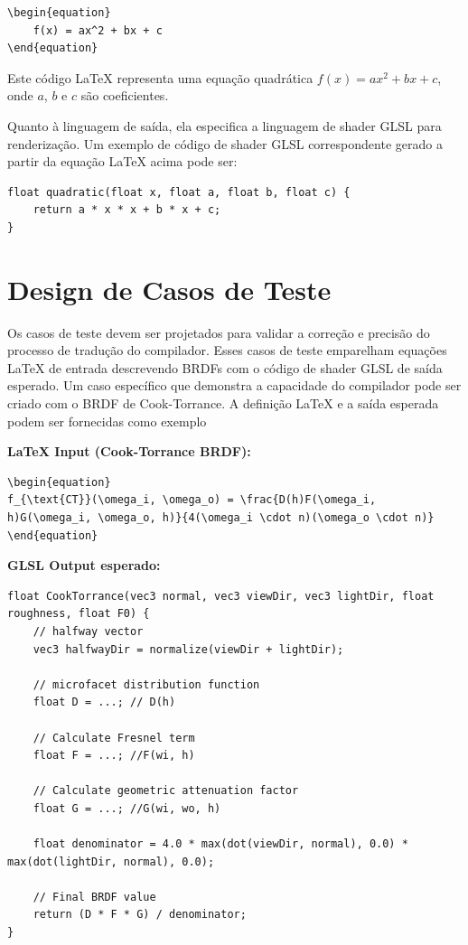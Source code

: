 \documentclass[english, 
               brazil, 
               bsc] %
               {dcomp-abntex2}
\begin{document}
\begin{verbatim}
\begin{equation}
    f(x) = ax^2 + bx + c
\end{equation}
\end{verbatim}

Este código LaTeX representa uma equação quadrática \( f(x) = ax^2 + bx + c \), onde \( a \), \( b \) e \( c \) são coeficientes.

Quanto à linguagem de saída, ela especifica a linguagem de shader GLSL para renderização. Um exemplo de código de shader GLSL correspondente gerado a partir da equação LaTeX acima pode ser:

\begin{verbatim}
float quadratic(float x, float a, float b, float c) {
    return a * x * x + b * x + c;
}
\end{verbatim}

\section{Design de Casos de Teste}



Os casos de teste devem ser projetados para validar a correção e precisão do processo de tradução do compilador. Esses casos de teste emparelham equações LaTeX de entrada descrevendo BRDFs com o código de shader GLSL de saída esperado. Um caso específico que demonstra a capacidade do compilador pode ser criado com o BRDF de Cook-Torrance. A definição LaTeX e a saída esperada podem ser fornecidas como exemplo

\textbf{LaTeX Input (Cook-Torrance BRDF):}
\begin{verbatim}
\begin{equation}
f_{\text{CT}}(\omega_i, \omega_o) = \frac{D(h)F(\omega_i, h)G(\omega_i, \omega_o, h)}{4(\omega_i \cdot n)(\omega_o \cdot n)}
\end{equation}
\end{verbatim}

\textbf{GLSL Output esperado:}
\begin{verbatim}
float CookTorrance(vec3 normal, vec3 viewDir, vec3 lightDir, float roughness, float F0) {
    // halfway vector
    vec3 halfwayDir = normalize(viewDir + lightDir);

    // microfacet distribution function
    float D = ...; // D(h)

    // Calculate Fresnel term
    float F = ...; //F(wi, h) 

    // Calculate geometric attenuation factor
    float G = ...; //G(wi, wo, h)

    float denominator = 4.0 * max(dot(viewDir, normal), 0.0) * max(dot(lightDir, normal), 0.0);

    // Final BRDF value
    return (D * F * G) / denominator;
}
\end{verbatim}
\end{document}

